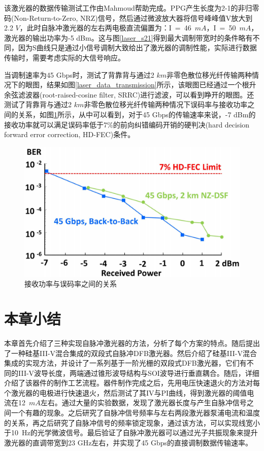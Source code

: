 该激光器的数据传输测试工作由Mahmoud帮助完成。PPG产生长度为2-1的非归零码(Non-Return-to-Zero, NRZ)信号，然后通过微波放大器将信号峰峰值V放大到2.2 $V$，此时自脉冲激光器的左右两电极直流偏置为：I~=~46~$mA$，I~=~50~$mA$，激光器的输出功率为-5 dBm。这与图\ref{laser_s21}得到最大调制带宽时的条件略有不同，因为S曲线只是通过小信号调制大致给出了激光器的调制性能，实际进行数据传输时，需要考虑实际的大信号响应。

当调制速率为45 Gbps时，测试了背靠背与通过2 $km$非零色散位移光纤传输两种情况下的眼图，结果如图\ref{laser_data_transmission}所示，该眼图已经通过一个根升余弦滤波器(root-raised-cosine filter, SRRC)进行滤波，可以看到睁开的眼图。还测试了背靠背与通过2 $km$非零色散位移光纤传输两种情况下误码率与接收功率之间的关系，如图\ref{laser_ber}所示，从中可以看到，对于45 Gbps的传输速率来说，-7 dBm的接收功率就可以满足误码率低于7\%的前向纠错编码开销的硬判决(hard decision forward error correction, HD-FEC)条件。

\begin{figure}[htb]
	\centering
	\includegraphics[width=13cm]{./Pictures/laser_ber.jpg}
	\captionsetup{justification=centering}
	\caption{接收功率与误码率之间的关系\cite{shahin201845}}
	\label{laser_ber}
\end{figure}

\section{本章小结}

本章首先介绍了三种实现自脉冲激光器的方法，分析了每个方案的特点。随后提出了一种硅基III-V混合集成的双段式自脉冲DFB激光器。然后介绍了硅基III-V混合集成的实现方法，并设计了一系列基于一阶光栅的双段式DFB激光器，它们有不同的III-V波导长度，两端通过锥形波导结构与SOI波导进行垂直耦合。随后，详细介绍了该器件的制作工艺流程。器件制作完成之后，先用电压快速退火的方法对每个激光器的电极进行快速退火，然后测试了其IV与PI曲线，得到激光器的阈值电流在12~$mA$左右。通过大量的实验数据，发现了激光器长度与产生自脉冲信号之间一个有趣的现象。之后研究了自脉冲信号频率与左右两段激光器泵浦电流和温度的关系，再之后研究了自脉冲信号的频率锁定现象，通过该方法，可以实现线宽小于10~Hz的光学微波信号。最后验证了自脉冲激光器可以通过光子共振现象来提升激光器的直调带宽到23 GHz左右，并实现了45 Gbps的直接调制数据传输速率。



